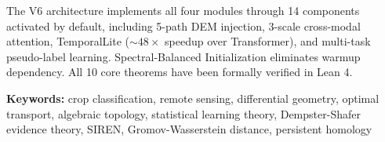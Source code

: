 The V6 architecture implements all four modules through 14 components activated
by default, including 5-path DEM injection, 3-scale cross-modal attention,
TemporalLite ($\sim48\times$ speedup over Transformer), and multi-task
pseudo-label learning. Spectral-Balanced Initialization eliminates warmup
dependency. All 10 core theorems have been formally verified in Lean 4.

\textbf{Keywords:} crop classification, remote sensing, differential geometry,
optimal transport, algebraic topology, statistical learning theory,
Dempster-Shafer evidence theory, SIREN, Gromov-Wasserstein distance,
persistent homology
